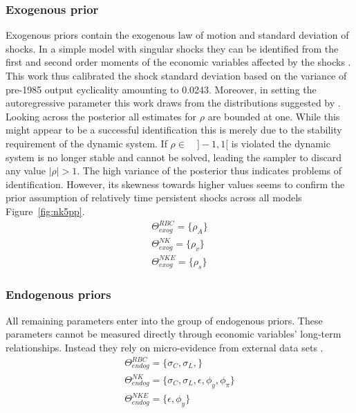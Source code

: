 \documentclass[12pt,a4paper,english]{article} %
\begin{document}
	\subsubsection{Exogenous prior}
	Exogenous priors contain the exogenous law of motion and standard deviation of shocks. In a simple model with singular shocks they can be identified from the first and second order moments of the economic variables affected by the shocks \cite{del_negro_forming_2008}. This work thus calibrated the shock standard deviation based on the variance of pre-1985 output cyclicality amounting to 0.0243. Moreover, in setting the autoregressive parameter this work draws from the distributions suggested by \cite{vasconez_what_2015}. Looking across the posterior all estimates for $\rho$ are bounded at one. While this might appear to be a successful identification this is merely due to the stability requirement of the dynamic system. If $\rho \in \quad ]-1,1[ $ is violated the dynamic system is no longer stable and cannot be solved, leading the sampler to discard any value $|\rho| > 1$. The high variance of the posterior thus indicates problems of identification. However, its skewness towards higher values seems to confirm the prior assumption of relatively time persistent shocks across all models Figure~\ref{fig:nk5pp}.
	\begin{equation}
		\begin{aligned}
			\Theta_{exog}^{RBC} = \{\rho_A \} \\
			\Theta_{exog}^{NK} = \{\rho_v \} \\
			\Theta_{exog}^{NKE} = \{\rho_s \}
		\end{aligned}
	\end{equation}

	\subsubsection{Endogenous priors}
	All remaining parameters enter into the group of endogenous priors. These parameters cannot be measured directly through economic variables' long-term relationships. Instead they rely on micro-evidence from external data sets \cite{del_negro_forming_2008}. 
		\begin{equation}
		\begin{aligned}
			\Theta_{endog}^{RBC} = \{\sigma_C, \sigma_L, \} \\
			\Theta_{endog}^{NK} = \{\sigma_C, \sigma_L, \epsilon, \phi_{y}, \phi_{\pi} \} \\
			\Theta_{endog}^{NKE} = \{\epsilon, \phi_{y}\}
		\end{aligned}
	\end{equation}
		
\end{document}
